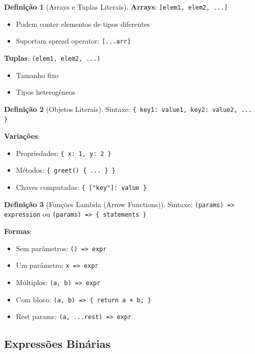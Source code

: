 \documentclass[12pt,a4paper]{article}
\theoremstyle{definition}
\newtheorem{definition}{Definição}[section]
\begin{document}
\begin{definition}[Arrays e Tuplas Literais]
\textbf{Arrays}: \texttt{[elem1, elem2, ...]}
\begin{itemize}
    \item Podem conter elementos de tipos diferentes
    \item Suportam spread operator: \texttt{[...arr]}
\end{itemize}

\textbf{Tuplas}: \texttt{(elem1, elem2, ...)}
\begin{itemize}
    \item Tamanho fixo
    \item Tipos heterogêneos
\end{itemize}
\end{definition}

\begin{definition}[Objetos Literais]
Sintaxe: \texttt{\{ key1: value1, key2: value2, ... \}}

\textbf{Variações}:
\begin{itemize}
    \item Propriedades: \texttt{\{ x: 1, y: 2 \}}
    \item Métodos: \texttt{\{ greet() \{ ... \} \}}
    \item Chaves computadas: \texttt{\{ ["key"]: value \}}
\end{itemize}
\end{definition}

\begin{definition}[Funções Lambda (Arrow Functions)]
Sintaxe: \texttt{(params) => expression} ou \texttt{(params) => \{ statements \}}

\textbf{Formas}:
\begin{itemize}
    \item Sem parâmetros: \texttt{() => expr}
    \item Um parâmetro: \texttt{x => expr}
    \item Múltiplos: \texttt{(a, b) => expr}
    \item Com bloco: \texttt{(a, b) => \{ return a + b; \}}
    \item Rest params: \texttt{(a, ...rest) => expr}
\end{itemize}
\end{definition}

\subsection{Expressões Binárias}
\end{document}
